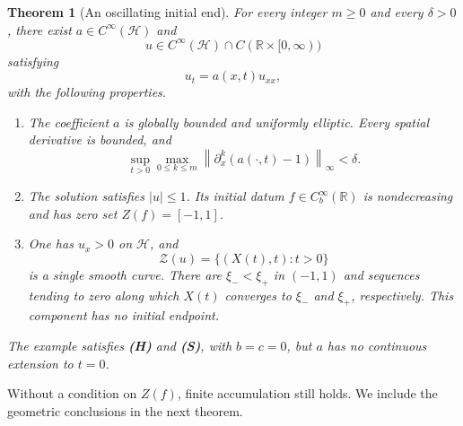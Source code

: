 \documentclass[11pt,reqno]{amsart}
\numberwithin{equation}{section}
\newtheorem{mainthm}{Theorem}
\theoremstyle{definition}
\theoremstyle{remark}
\newcommand{\R}{\mathbb R}
\newcommand{\HH}{\mathcal H}
\newcommand{\ZZ}{\mathcal Z}
\newcommand{\norm}[1]{\left\lVert#1\right\rVert}
\begin{document}
\begin{mainthm}[An oscillating initial end]\label{thm:B}
For every integer $m\geq0$ and every $\delta>0$, there exist $a\in C^\infty(\HH)$ and
\[
 u\in C^\infty(\HH)\cap C(\R\times[0,\infty))
\]
satisfying
\begin{equation}\label{eq:counterpde}
 u_t=a(x,t)u_{xx},
\end{equation}
with the following properties.
\begin{enumerate}
\item The coefficient $a$ is globally bounded and uniformly elliptic. Every spatial derivative is bounded, and
\begin{equation}\label{eq:smallthm}
 \sup_{t>0}\max_{0\leq k\leq m}
 \norm{\partial_x^k(a(\cdot,t)-1)}_\infty<\delta.
\end{equation}
\item The solution satisfies $|u|\leq1$. Its initial datum $f\in C_b^\infty(\R)$ is nondecreasing and has zero set $Z(f)=[-1,1]$.
\item One has $u_x>0$ on $\HH$, and
\[
 \ZZ(u)=\{(X(t),t):t>0\}
\]
is a single smooth curve. There are $\xi_-<\xi_+$ in $(-1,1)$ and sequences tending to zero along which $X(t)$ converges to $\xi_-$ and $\xi_+$, respectively. This component has no initial endpoint.
\end{enumerate}
The example satisfies \textbf{(H)} and \textbf{(S)}, with $b=c=0$, but $a$ has no continuous extension to $t=0$.
\end{mainthm}

Without a condition on $Z(f)$, finite accumulation still holds. We include the geometric conclusions in the next theorem.
\end{document}

